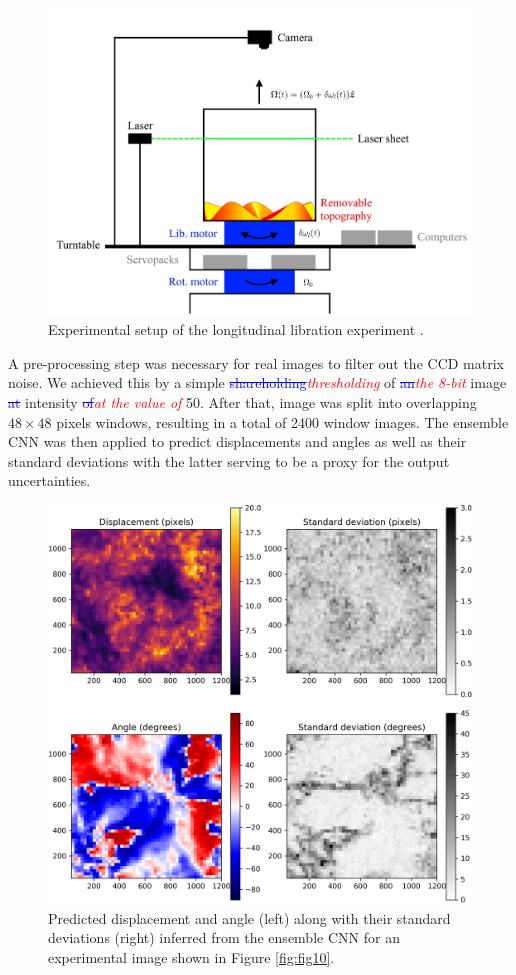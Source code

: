 \documentclass{svjour3}                     %
\newcommand{\new}[1]{\textit{\textcolor{red}{#1}}}
\newcommand{\old}[1]{\textcolor{blue}{\sout{#1}}}
\begin{document}
\begin{figure}
	\includegraphics[width=\textwidth]{figs/figureExperiment.jpg}
	\caption{Experimental setup of the longitudinal libration experiment \cite{MeisterMSC}.}
	\label{fig:MeisterMSC}
\end{figure}

A pre-processing step was necessary for real images to filter out the CCD matrix noise. We achieved this by a simple \old{shareholding}\new{thresholding} of \old{an}\new{the 8-bit} image \old{at} intensity \old{of}\new{at the value of} 50. After that, image was split into overlapping $48\times 48$ pixels windows, resulting in a total of 2400 window images. The ensemble CNN was then applied to predict displacements and angles as well as their standard deviations with the latter serving to be a proxy for the output uncertainties. 

\begin{figure}
\includegraphics[width=\textwidth]{figs/figure8a.png}
\caption{Predicted displacement and angle (left) along with their standard deviations (right) inferred from the ensemble CNN for an experimental image shown in Figure \ref{fig:fig10}.}
\label{fig:fig9a}
\end{figure}
\end{document}
